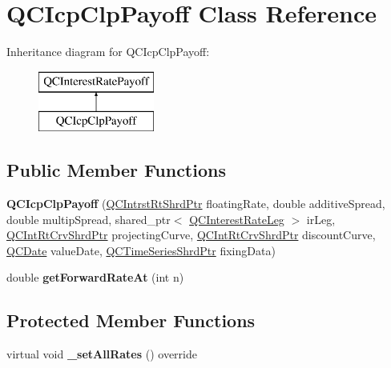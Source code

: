\hypertarget{class_q_c_icp_clp_payoff}{\section{Q\+C\+Icp\+Clp\+Payoff Class Reference}
\label{class_q_c_icp_clp_payoff}
}
Inheritance diagram for Q\+C\+Icp\+Clp\+Payoff\+:\begin{figure}[H]
\begin{center}
\leavevmode
\includegraphics[height=2.000000cm]{class_q_c_icp_clp_payoff}
\end{center}
\end{figure}
\subsection*{Public Member Functions}
\begin{DoxyCompactItemize}
\item 
\hypertarget{class_q_c_icp_clp_payoff_a59a723c0acdd41ad77877210c73a5fd1}{{\bfseries Q\+C\+Icp\+Clp\+Payoff} (\hyperlink{_q_c_definitions_8h_ae6a21ad26d19e482e3b01179cbc05298}{Q\+C\+Intrst\+Rt\+Shrd\+Ptr} floating\+Rate, double additive\+Spread, double multip\+Spread, shared\+\_\+ptr$<$ \hyperlink{class_q_c_interest_rate_leg}{Q\+C\+Interest\+Rate\+Leg} $>$ ir\+Leg, \hyperlink{_q_c_definitions_8h_a4b4fb466e49550e3dfd40003562cd19d}{Q\+C\+Int\+Rt\+Crv\+Shrd\+Ptr} projecting\+Curve, \hyperlink{_q_c_definitions_8h_a4b4fb466e49550e3dfd40003562cd19d}{Q\+C\+Int\+Rt\+Crv\+Shrd\+Ptr} discount\+Curve, \hyperlink{class_q_c_date}{Q\+C\+Date} value\+Date, \hyperlink{_q_c_definitions_8h_a6a601ffd693c05dd81309e3dca08b8f5}{Q\+C\+Time\+Series\+Shrd\+Ptr} fixing\+Data)}\label{class_q_c_icp_clp_payoff_a59a723c0acdd41ad77877210c73a5fd1}

\item 
\hypertarget{class_q_c_icp_clp_payoff_a263487dea487c5f3e326797dda3ad90b}{double {\bfseries get\+Forward\+Rate\+At} (int n)}\label{class_q_c_icp_clp_payoff_a263487dea487c5f3e326797dda3ad90b}

\end{DoxyCompactItemize}
\subsection*{Protected Member Functions}
\begin{DoxyCompactItemize}
\item 
\hypertarget{class_q_c_icp_clp_payoff_af962eed7dbb1968c86575fb7d795f066}{virtual void {\bfseries \+\_\+set\+All\+Rates} () override}\label{class_q_c_icp_clp_payoff_af962eed7dbb1968c86575fb7d795f066}

\end{DoxyCompactItemize}
